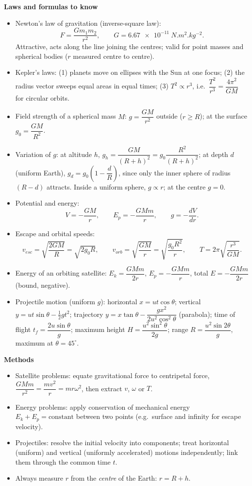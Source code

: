 \documentclass[11pt]{article}
\newcommand{\cle}[1]{{\popxbold\color{popdark}#1}}
\begin{document}
\begin{bilan}
\textbf{Laws and formulas to know}
\begin{itemize}
\item \cle{Newton's law of gravitation} (inverse-square law):
\[ F=\frac{Gm_1m_2}{r^2},\qquad G=\SI{6.67e-11}{N.m^2.kg^{-2}}. \]
Attractive, acts along the line joining the centres; valid for point masses and spherical bodies ($r$ measured centre to centre).
\item \cle{Kepler's laws}: (1) planets move on ellipses with the Sun at one focus; (2) the radius vector sweeps equal areas in equal times; (3) $T^2\propto r^3$, i.e.\ $\dfrac{T^2}{r^3}=\dfrac{4\pi^2}{GM}$ for circular orbits.
\item Field strength of a spherical mass $M$: $g=\dfrac{GM}{r^2}$ outside ($r\ge R$); at the surface $g_0=\dfrac{GM}{R^2}$.
\item \cle{Variation of $g$}: at altitude $h$, $g_h=\dfrac{GM}{(R+h)^2}=g_0\dfrac{R^2}{(R+h)^2}$; at depth $d$ (uniform Earth), $g_d=g_0\left(1-\dfrac{d}{R}\right)$, since only the inner sphere of radius $(R-d)$ attracts. Inside a uniform sphere, $g\propto r$; at the centre $g=0$.
\item Potential and energy:
\[ V=-\frac{GM}{r},\qquad E_p=-\frac{GMm}{r},\qquad g=-\frac{dV}{dr}. \]
\item Escape and orbital speeds:
\[ v_{esc}=\sqrt{\frac{2GM}{R}}=\sqrt{2g_0R},\qquad v_{orb}=\sqrt{\frac{GM}{r}}=\sqrt{\frac{g_0R^2}{r}},\qquad T=2\pi\sqrt{\frac{r^3}{GM}}. \]
\item Energy of an orbiting satellite: $E_k=\dfrac{GMm}{2r}$, $E_p=-\dfrac{GMm}{r}$, total $E=-\dfrac{GMm}{2r}$ (bound, negative).
\item Projectile motion (uniform $g$): horizontal $x=ut\cos\theta$; vertical $y=ut\sin\theta-\tfrac{1}{2}gt^2$; trajectory $y=x\tan\theta-\dfrac{gx^2}{2u^2\cos^2\theta}$ (parabola); time of flight $t_f=\dfrac{2u\sin\theta}{g}$; maximum height $H=\dfrac{u^2\sin^2\theta}{2g}$; range $R=\dfrac{u^2\sin2\theta}{g}$, maximum at $\theta=45^\circ$.
\end{itemize}

\textbf{Methods}
\begin{itemize}
\item Satellite problems: equate gravitational force to centripetal force, $\dfrac{GMm}{r^2}=\dfrac{mv^2}{r}=mr\omega^2$, then extract $v$, $\omega$ or $T$.
\item Energy problems: apply conservation of mechanical energy $E_k+E_p=\text{constant}$ between two points (e.g.\ surface and infinity for escape velocity).
\item Projectiles: resolve the initial velocity into components; treat horizontal (uniform) and vertical (uniformly accelerated) motions independently; link them through the common time $t$.
\item Always measure $r$ from the \emph{centre} of the Earth: $r=R+h$.
\end{itemize}


\end{bilan}
\end{document}
